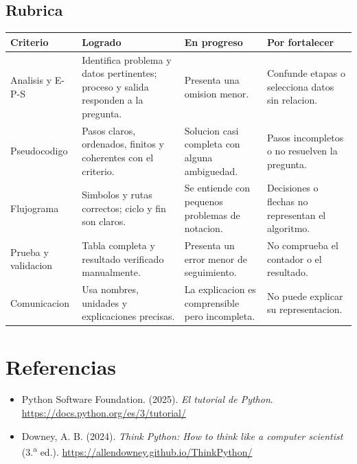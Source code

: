 \documentclass[11pt,a4paper]{article}
\begin{document}
\subsection{Rubrica}
\begin{center}
\renewcommand{\arraystretch}{1.3}
\begin{tabularx}{\textwidth}{>{\raggedright\arraybackslash}p{3.3cm}XXX}
\toprule
\textbf{Criterio} & \textbf{Logrado} & \textbf{En progreso} & \textbf{Por fortalecer} \\
\midrule
Analisis y E-P-S & Identifica problema y datos pertinentes; proceso y salida responden a la pregunta. & Presenta una omision menor. & Confunde etapas o selecciona datos sin relacion. \\
Pseudocodigo & Pasos claros, ordenados, finitos y coherentes con el criterio. & Solucion casi completa con alguna ambiguedad. & Pasos incompletos o no resuelven la pregunta. \\
Flujograma & Simbolos y rutas correctos; ciclo y fin son claros. & Se entiende con pequenos problemas de notacion. & Decisiones o flechas no representan el algoritmo. \\
Prueba y validacion & Tabla completa y resultado verificado manualmente. & Presenta un error menor de seguimiento. & No comprueba el contador o el resultado. \\
Comunicacion & Usa nombres, unidades y explicaciones precisas. & La explicacion es comprensible pero incompleta. & No puede explicar su representacion. \\
\bottomrule
\end{tabularx}
\end{center}

\section{Referencias}
\begin{itemize}
  \item Python Software Foundation. (2025). \emph{El tutorial de Python}. \url{https://docs.python.org/es/3/tutorial/}
  \item Downey, A. B. (2024). \emph{Think Python: How to think like a computer scientist} (3.\textsuperscript{a} ed.). \url{https://allendowney.github.io/ThinkPython/}
\end{itemize}
\end{document}
